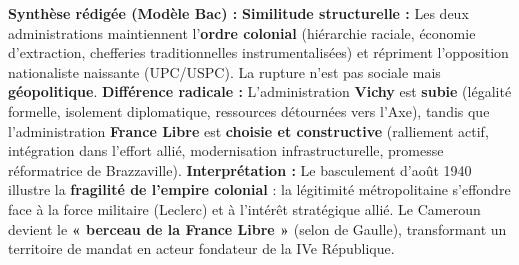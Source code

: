 \documentclass[11pt]{article}
\begin{document}
\begin{exoresolu}
\textbf{Synthèse rédigée (Modèle Bac) :}
\textbf{Similitude structurelle :} Les deux administrations maintiennent l'\textbf{ordre colonial} (hiérarchie raciale, économie d'extraction, chefferies traditionnelles instrumentalisées) et répriment l'opposition nationaliste naissante (UPC/USPC). La rupture n'est pas sociale mais \textbf{géopolitique}.
\textbf{Différence radicale :} L'administration \textbf{Vichy} est \textbf{subie} (légalité formelle, isolement diplomatique, ressources détournées vers l'Axe), tandis que l'administration \textbf{France Libre} est \textbf{choisie et constructive} (ralliement actif, intégration dans l'effort allié, modernisation infrastructurelle, promesse réformatrice de Brazzaville).
\textbf{Interprétation :} Le basculement d'août 1940 illustre la \textbf{fragilité de l'empire colonial} : la légitimité métropolitaine s'effondre face à la force militaire (Leclerc) et à l'intérêt stratégique allié. Le Cameroun devient le \textbf{« berceau de la France Libre »} (selon de Gaulle), transformant un territoire de mandat en acteur fondateur de la IVe République.

\end{exoresolu}
\end{document}
